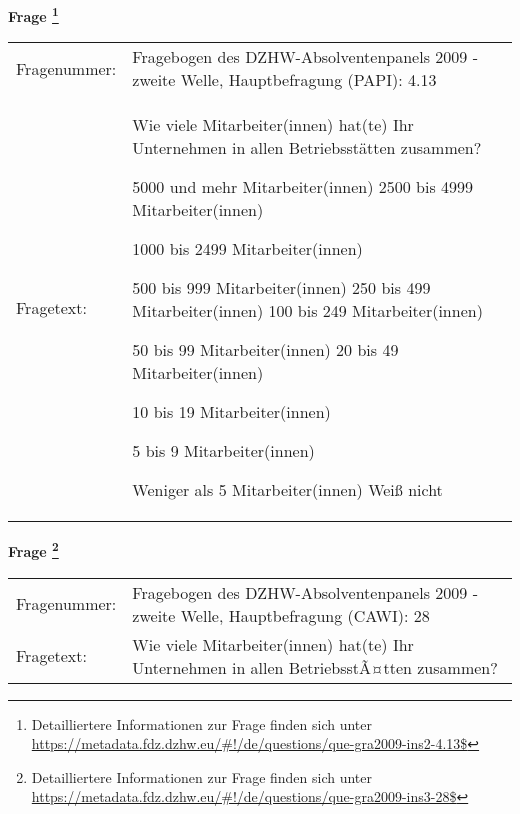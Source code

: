 				\vspace*{0.5cm}
                \noindent\textbf{Frage
	                \footnote{Detailliertere Informationen zur Frage finden sich unter
		              \url{https://metadata.fdz.dzhw.eu/\#!/de/questions/que-gra2009-ins2-4.13$}}}\\
				\begin{tabularx}{\hsize}{@{}lX}
					Fragenummer: &
					  Fragebogen des DZHW-Absolventenpanels 2009 - zweite Welle, Hauptbefragung (PAPI):
					  4.13
 \\
					Fragetext: & Wie viele Mitarbeiter(innen) hat(te) Ihr Unternehmen in allen Betriebsstätten zusammen?\par  5000 und mehr Mitarbeiter(innen) 2500 bis 4999 Mitarbeiter(innen)\par  1000 bis 2499 Mitarbeiter(innen)\par  500 bis 999 Mitarbeiter(innen) 250 bis 499 Mitarbeiter(innen) 100 bis 249 Mitarbeiter(innen)\par  50 bis 99 Mitarbeiter(innen) 20 bis 49 Mitarbeiter(innen)\par  10 bis 19 Mitarbeiter(innen)\par  5 bis 9 Mitarbeiter(innen)\par  Weniger als 5 Mitarbeiter(innen) Weiß nicht \\
				\end{tabularx}
				\vspace*{0.5cm}
                \noindent\textbf{Frage
	                \footnote{Detailliertere Informationen zur Frage finden sich unter
		              \url{https://metadata.fdz.dzhw.eu/\#!/de/questions/que-gra2009-ins3-28$}}}\\
				\begin{tabularx}{\hsize}{@{}lX}
					Fragenummer: &
					  Fragebogen des DZHW-Absolventenpanels 2009 - zweite Welle, Hauptbefragung (CAWI):
					  28
 \\
					Fragetext: & Wie viele Mitarbeiter(innen) hat(te) Ihr Unternehmen in allen BetriebsstÃ¤tten zusammen? \\
				\end{tabularx}





